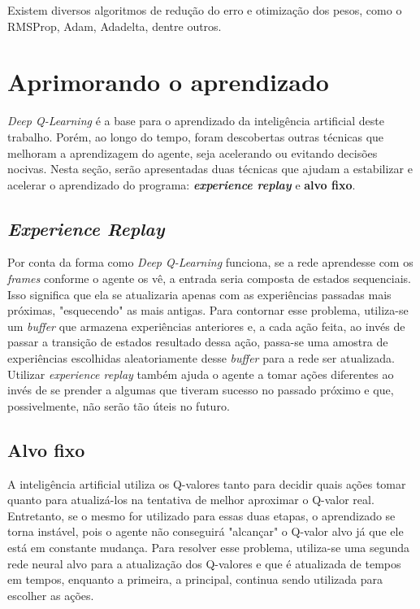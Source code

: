 Existem diversos algoritmos de redução do erro e otimização dos pesos, como o RMSProp, Adam, Adadelta, dentre outros.


\section{Aprimorando o aprendizado}
\label{sec:enhance}

\textit{Deep Q-Learning} é a base para o aprendizado da inteligência artificial deste trabalho.
Porém, ao longo do tempo, foram descobertas outras técnicas que melhoram a aprendizagem do agente, seja acelerando ou evitando decisões nocivas.
Nesta seção, serão apresentadas duas técnicas que ajudam a estabilizar e acelerar o aprendizado do programa:
\textit{\textbf{experience replay}} e \textbf{alvo fixo}.


\subsection{\textit{Experience Replay}}
\label{sec:er}

Por conta da forma como \textit{Deep Q-Learning} funciona, se a rede aprendesse com os \textit{frames} conforme o agente os vê, a entrada seria composta de estados sequenciais.
Isso significa que ela se atualizaria apenas com as experiências passadas mais próximas, "esquecendo"{} as mais antigas.
Para contornar esse problema, utiliza-se um \textit{buffer} que armazena experiências anteriores e, a cada ação feita, ao invés de passar a transição de estados resultado dessa ação, passa-se uma amostra de experiências escolhidas aleatoriamente desse \textit{buffer} para a rede ser atualizada.
Utilizar \textit{experience replay} também ajuda o agente a tomar ações diferentes ao invés de se prender a algumas que tiveram sucesso no passado próximo e que, possivelmente, não serão tão úteis no futuro.


\subsection{Alvo fixo}
\label{sec:ft}

A inteligência artificial utiliza os Q-valores tanto para decidir quais ações tomar quanto para atualizá-los na tentativa de melhor aproximar o Q-valor real.
Entretanto, se o mesmo for utilizado para essas duas etapas, o aprendizado se torna instável, pois o agente não conseguirá "alcançar"{} o Q-valor alvo já que ele está em constante mudança.
Para resolver esse problema, utiliza-se uma segunda rede neural alvo para a atualização dos Q-valores e que é atualizada de tempos em tempos, enquanto a primeira, a principal, continua sendo utilizada para escolher as ações.

